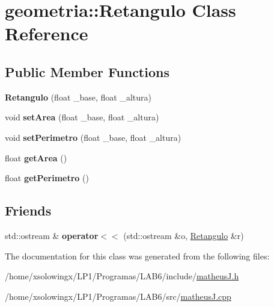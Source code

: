 \hypertarget{classgeometria_1_1Retangulo}{}\section{geometria\+:\+:Retangulo Class Reference}
\label{classgeometria_1_1Retangulo}
\subsection*{Public Member Functions}
\begin{DoxyCompactItemize}
\item 
\mbox{\label{classgeometria_1_1Retangulo_a38f97c6612913f797c1e843fd56e53f2}} 
{\bfseries Retangulo} (float \+\_\+base, float \+\_\+altura)
\item 
\mbox{\label{classgeometria_1_1Retangulo_a461ef9bc00500b6819e13534cc349cea}} 
void {\bfseries set\+Area} (float \+\_\+base, float \+\_\+altura)
\item 
\mbox{\label{classgeometria_1_1Retangulo_a9729206441440bb92facccc50ae7c3ca}} 
void {\bfseries set\+Perimetro} (float \+\_\+base, float \+\_\+altura)
\item 
\mbox{\label{classgeometria_1_1Retangulo_a70439fe0bccb27dc523ccbdc8b1cbcce}} 
float {\bfseries get\+Area} ()
\item 
\mbox{\label{classgeometria_1_1Retangulo_a655829290a92434587d2fcec61e7d801}} 
float {\bfseries get\+Perimetro} ()
\end{DoxyCompactItemize}
\subsection*{Friends}
\begin{DoxyCompactItemize}
\item 
\mbox{\label{classgeometria_1_1Retangulo_a86ae18bb1e128547abaf4f5fe6002d13}} 
std\+::ostream \& {\bfseries operator$<$$<$} (std\+::ostream \&o, \hyperlink{classgeometria_1_1Retangulo}{Retangulo} \&r)
\end{DoxyCompactItemize}


The documentation for this class was generated from the following files\+:\begin{DoxyCompactItemize}
\item 
/home/xsolowingx/\+L\+P1/\+Programas/\+L\+A\+B6/include/\hyperlink{matheusJ_8h}{matheus\+J.\+h}\item 
/home/xsolowingx/\+L\+P1/\+Programas/\+L\+A\+B6/src/\hyperlink{matheusJ_8cpp}{matheus\+J.\+cpp}\end{DoxyCompactItemize}
